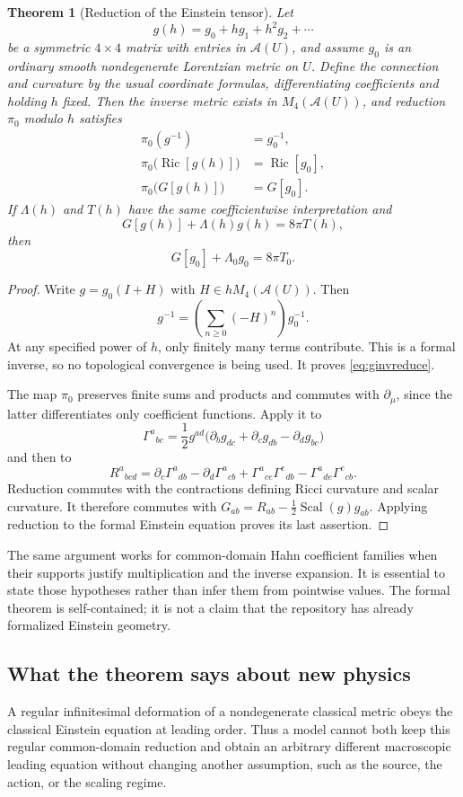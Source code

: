 \documentclass[11pt,a4paper]{article}
\numberwithin{equation}{section}
\newtheorem{theorem}{Theorem}[section]
\theoremstyle{definition}
\theoremstyle{remark}
\newcommand{\Ric}{\operatorname{Ric}}
\newcommand{\Scal}{\operatorname{Scal}}
\begin{document}
\begin{theorem}[Reduction of the Einstein tensor]\label{thm:einstein}
Let
\[
g(h)=g_0+h g_1+h^2g_2+\cdots
\]
be a symmetric $4\times4$ matrix with entries in $\mathcal A(U)$, and assume
$g_0$ is an ordinary smooth nondegenerate Lorentzian metric on $U$. Define the
connection and curvature by the usual coordinate formulas, differentiating
coefficients and holding $h$ fixed. Then the inverse metric exists in
$M_4(\mathcal A(U))$, and reduction $\pi_0$ modulo $h$ satisfies
\begin{align}
\pi_0(g^{-1})&=g_0^{-1},\label{eq:ginvreduce}\\
\pi_0\bigl(\Ric[g(h)]\bigr)&=\Ric[g_0],\label{eq:ricreduce}\\
\pi_0\bigl(G[g(h)]\bigr)&=G[g_0].\label{eq:einreduce}
\end{align}
If $\Lambda(h)$ and $T(h)$ have the same coefficientwise interpretation and
\[
G[g(h)]+\Lambda(h)g(h)=8\pi T(h),
\]
then
\[
G[g_0]+\Lambda_0g_0=8\pi T_0.
\]
\end{theorem}
\begin{proof}
Write $g=g_0(I+H)$ with $H\in hM_4(\mathcal A(U))$. Then
\[
g^{-1}=\left(\sum_{n\ge0}(-H)^n\right)g_0^{-1}.
\]
At any specified power of $h$, only finitely many terms contribute. This is a
formal inverse, so no topological convergence is being used. It proves
\eqref{eq:ginvreduce}.

The map $\pi_0$ preserves finite sums and products and commutes with
$\partial_\mu$, since the latter differentiates only coefficient functions.
Apply it to
\[
\Gamma^a{}_{bc}
=\frac12 g^{ad}\bigl(\partial_b g_{dc}+\partial_c g_{db}
                         -\partial_d g_{bc}\bigr)
\]
and then to
\[
R^a{}_{bcd}=\partial_c\Gamma^a{}_{db}-\partial_d\Gamma^a{}_{cb}
 +\Gamma^a{}_{ce}\Gamma^e{}_{db}-\Gamma^a{}_{de}\Gamma^e{}_{cb}.
\]
Reduction commutes with the contractions defining Ricci curvature and scalar
curvature. It therefore commutes with
$G_{ab}=R_{ab}-\tfrac12\Scal(g)g_{ab}$. Applying reduction to the formal
Einstein equation proves its last assertion.
\end{proof}

The same argument works for common-domain Hahn coefficient families when their
supports justify multiplication and the inverse expansion. It is essential to
state those hypotheses rather than infer them from pointwise values. The
formal theorem is self-contained; it is not a claim that the repository has
already formalized Einstein geometry.

\subsection{What the theorem says about new physics}
A regular infinitesimal deformation of a nondegenerate classical metric obeys
the classical Einstein equation at leading order. Thus a model cannot both keep
this regular common-domain reduction and obtain an arbitrary different
macroscopic leading equation without changing another assumption, such as the
source, the action, or the scaling regime.
\end{document}
